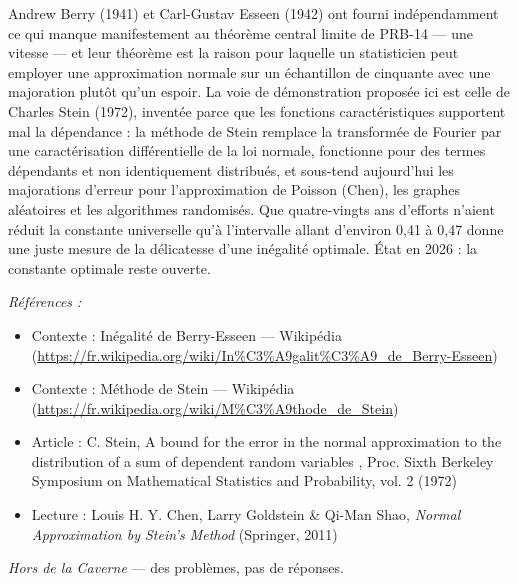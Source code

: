 \documentclass[11pt]{article}
\newenvironment{refs}{\par\small\noindent\emph{Références :}\begin{itemize}\setlength\itemsep{0pt}}{\end{itemize}\normalsize}
\begin{document}
\noindent Andrew Berry (1941) et Carl-Gustav Esseen (1942) ont fourni indépendamment ce
qui manque manifestement au théorème central limite de PRB-14 --- une vitesse --- et leur théorème est
la raison pour laquelle un statisticien peut employer une approximation normale sur un échantillon
de cinquante avec une majoration plutôt qu'un espoir. La voie de démonstration proposée ici est
celle de Charles Stein (1972), inventée parce que les fonctions caractéristiques supportent mal la
dépendance : la méthode de Stein remplace la transformée de Fourier par une caractérisation
différentielle de la loi normale, fonctionne pour des termes dépendants et non identiquement
distribués, et sous-tend aujourd'hui les majorations d'erreur pour l'approximation de Poisson
(Chen), les graphes aléatoires et les algorithmes randomisés. Que quatre-vingts ans d'efforts
n'aient réduit la constante universelle qu'à l'intervalle allant d'environ 0,41 à 0,47 donne une
juste mesure de la délicatesse d'une inégalité optimale. État en 2026 : la constante optimale reste
ouverte.

\begin{refs}
\item Contexte : Inégalité de Berry-Esseen --- Wikipédia (\url{https://fr.wikipedia.org/wiki/In%C3%A9galit%C3%A9_de_Berry-Esseen})
\item Contexte : Méthode de Stein --- Wikipédia (\url{https://fr.wikipedia.org/wiki/M%C3%A9thode_de_Stein})
\item Article : C. Stein, \og{} A bound for the error in the normal approximation to the distribution of a sum of dependent random variables \fg{}, Proc. Sixth Berkeley Symposium on Mathematical Statistics and Probability, vol. 2 (1972)
\item Lecture : Louis H. Y. Chen, Larry Goldstein \& Qi-Man Shao, \textit{Normal Approximation by Stein's Method} (Springer, 2011)
\end{refs}

\bigskip


\vfill
\noindent\emph{Hors de la Caverne} --- des probl\`emes, pas de r\'eponses.
\end{document}
